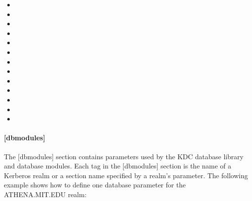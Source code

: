 \documentclass[letterpaper,10pt,english]{sphinxmanual}
\begin{document}
\begin{itemize}
\item {} 

\item {} 

\item {} 

\item {} 

\item {} 

\item {} 

\item {} 

\item {} 

\item {} 

\item {} 

\item {} 

\item {} 

\item {} 

\end{itemize}


\paragraph{{[}dbmodules{]}}
\label{\detokenize{admin/conf_files/kdc_conf:dbmodules}}\label{\detokenize{admin/conf_files/kdc_conf:id3}}
The {[}dbmodules{]} section contains parameters used by the KDC database
library and database modules.  Each tag in the {[}dbmodules{]} section is
the name of a Kerberos realm or a section name specified by a realm’s
 parameter.  The following example shows how to
define one database parameter for the ATHENA.MIT.EDU realm:
\end{document}

